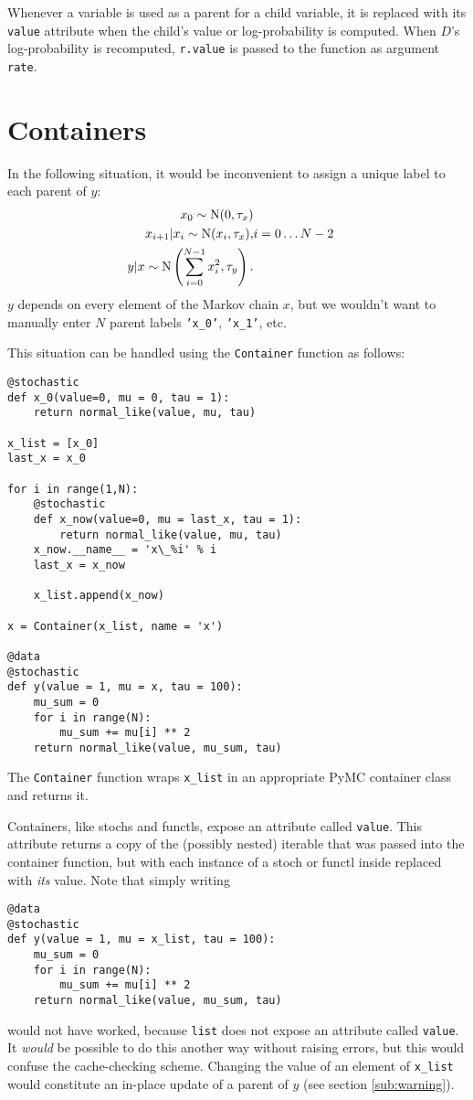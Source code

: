 Whenever a variable is used as a parent for a child variable, it is replaced with its \texttt{value} attribute when the child's value or log-probability is computed. When $D$'s log-probability is recomputed, \texttt{r.value} is passed to the function as argument \texttt{rate}. 

\section{Containers}\label{sub:container}
In the following situation, it would be inconvenient to assign a unique label to each parent of $y$:
\begin{eqnarray*}
    x_0 \sim \textup N(0,\tau_x)\\
    x_{i+1}|x_i\sim\textup{N}(x_i, \tau_x),& i=0\ldots N-2\\
    y|x \sim \textup N\left(\sum_{i=0}^{N-1}x_i^2,\tau_y\right).
\end{eqnarray*}
$y$ depends on every element of the Markov chain $x$, but we wouldn't want to manually enter $N$ parent labels \texttt{'x_0'}, \texttt{'x\_1'}, etc.

This situation can be handled using the \texttt{Container} function as follows:
\begin{verbatim}
@stochastic
def x_0(value=0, mu = 0, tau = 1):
    return normal_like(value, mu, tau)

x_list = [x_0]
last_x = x_0

for i in range(1,N):          
    @stochastic
    def x_now(value=0, mu = last_x, tau = 1):
        return normal_like(value, mu, tau)
    x_now.__name__ = 'x\_%i' % i
    last_x = x_now
    
    x_list.append(x_now)
        
x = Container(x_list, name = 'x')

@data
@stochastic
def y(value = 1, mu = x, tau = 100):
    mu_sum = 0
    for i in range(N):
        mu_sum += mu[i] ** 2
    return normal_like(value, mu_sum, tau)
\end{verbatim}
The \texttt{Container} function wraps \texttt{x\_list} in an appropriate PyMC container class and returns it.

Containers, like stochs and functls, expose an attribute called \texttt{value}. This attribute returns a copy of the (possibly nested) iterable that was passed into the container function, but with each instance of a stoch or functl inside replaced with \emph{its} value. Note that simply writing
\begin{verbatim}
@data
@stochastic
def y(value = 1, mu = x_list, tau = 100):
    mu_sum = 0
    for i in range(N):
        mu_sum += mu[i] ** 2
    return normal_like(value, mu_sum, tau)
\end{verbatim}
would not have worked, because \texttt{list} does not expose an attribute called \texttt{value}. It \emph{would} be possible to do this another way without raising errors, but this would confuse the cache-checking scheme. Changing the value of an element of \texttt{x\_list} would constitute an in-place update of a parent of $y$ (see section \ref{sub:warning}).

